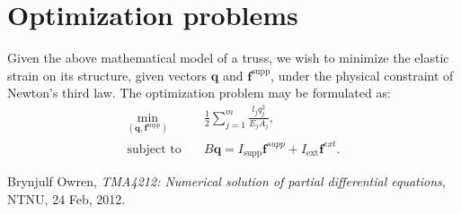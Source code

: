 \documentclass[10pt,a4paper]{article}
\begin{document}
\section{Optimization problems}
Given the above mathematical model of a truss, we wish to minimize the elastic strain on its structure, given vectors $\boldsymbol{q}$ and $\boldsymbol{f}^{\text{supp}}$, under the physical constraint of Newton's third law. The optimization problem may be formulated as:
\begin{align}
\min\limits_{(\boldsymbol{q},\boldsymbol{f}^{\text{supp}})}\quad&\frac{1}{2}\sum_{j=1}^m \frac{l_j q_j^2}{E_j A_j},\\
\text{subject to} \quad &B\boldsymbol{q} = I_\text{supp}\boldsymbol{f}^{supp}+I_\text{ext}\boldsymbol{f}^{ext}.
\end{align}

\begin{thebibliography}{2}
Brynjulf Owren, \emph{TMA4212: Numerical solution of partial differential equations}, NTNU, 24 Feb, 2012.
\end{thebibliography}
\end{document}
